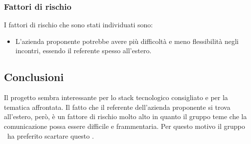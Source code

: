 \documentclass[../StudioDiFattibilita.tex]{subfiles}
\begin{document}
			\subsubsection{Fattori di rischio}
			I fattori di rischio che sono stati individuati sono:
			\begin{itemize}
				\item L'azienda proponente potrebbe avere più difficoltà e meno flessibilità negli incontri, essendo il referente spesso all'estero.
			\end{itemize}
			\subsection{Conclusioni}
			Il progetto sembra interessante per lo stack tecnologico consigliato e per la tematica affrontata. Il fatto che il referente dell'azienda proponente si trova all'estero, però, è un fattore di rischio molto alto in quanto il gruppo teme che la comunicazione possa essere difficile e frammentaria. Per questo motivo il gruppo \kaleidoscode\ ha preferito scartare questo .
\end{document}
